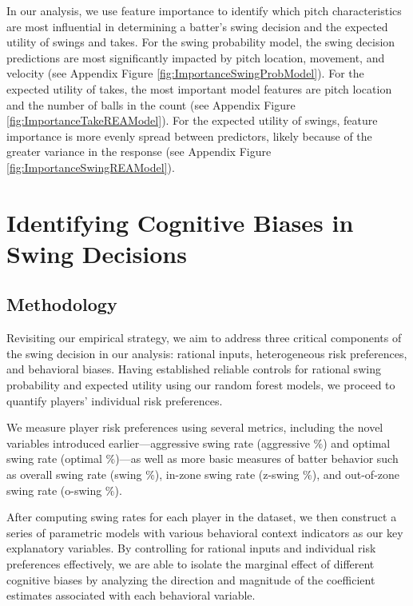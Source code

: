 \documentclass[12pt]{article}
\numberwithin{equation}{section}
\begin{document}
In our analysis, we use feature importance to identify which pitch characteristics are most influential in determining a batter's swing decision and the expected utility of swings and takes. For the swing probability model, the swing decision predictions are most significantly impacted by pitch location, movement, and velocity (see Appendix Figure \ref{fig:ImportanceSwingProbModel}). For the expected utility of takes, the most important model features are pitch location and the number of balls in the count  (see Appendix Figure \ref{fig:ImportanceTakeREAModel}). For the expected utility of swings, feature importance is more evenly spread between predictors, likely because of the greater variance in the response (see Appendix Figure \ref{fig:ImportanceSwingREAModel}). 

\section{Identifying Cognitive Biases in Swing Decisions}

\subsection{Methodology}

Revisiting our empirical strategy, we aim to address three critical components of the swing decision in our analysis: rational inputs, heterogeneous risk preferences, and behavioral biases. Having established reliable controls for rational swing probability and expected utility using our random forest models, we proceed to quantify players’ individual risk preferences.

\vspace{5mm} %

We measure player risk preferences using several metrics, including the novel variables introduced earlier—aggressive swing rate (aggressive $\%$) and optimal swing rate (optimal $\%$)—as well as more basic measures of batter behavior such as overall swing rate (swing $\%$), in-zone swing rate (z-swing $\%$), and out-of-zone swing rate (o-swing $\%$).

\vspace{5mm} %

After computing swing rates for each player in the dataset, we then construct a series of parametric models with various behavioral context indicators as our key explanatory variables. By controlling for rational inputs and individual risk preferences effectively, we are able to isolate the marginal effect of different cognitive biases by analyzing the direction and magnitude of the coefficient estimates associated with each behavioral variable.
\end{document}
